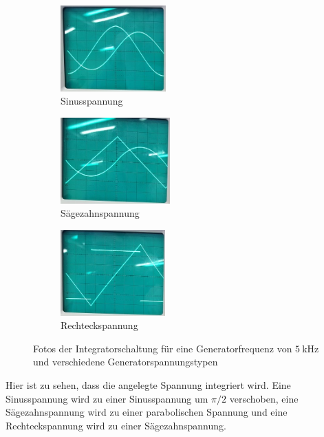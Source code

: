 \begin{figure}
    \centering
    \begin{subfigure}{0.3\textwidth}
        \centering
        \includegraphics[height=3.3cm]{images/foto_03_ausschnitt.jpg}
        \caption{Sinusspannung}
        \label{fig:foto_sin_integrator}
    \end{subfigure}
    \begin{subfigure}{0.3\textwidth}
        \centering
        \includegraphics[height=3.3cm]{images/foto_04_ausschnitt.jpg}
        \caption{Sägezahnspannung}
        \label{fig:foto_saege_integrator}
    \end{subfigure}
    \begin{subfigure}{0.3\textwidth}
        \centering
        \includegraphics[height=3.3cm]{images/foto_05_ausschnitt.jpg}
        \caption{Rechteckspannung}
        \label{fig:foto_rechteck_integrator}
    \end{subfigure}
    \caption{Fotos der Integratorschaltung für eine Generatorfrequenz von $\SI{5}{\kilo\hertz}$ und verschiedene Generatorspannungstypen}
    \label{fig:fotos_integrator}
\end{figure}

Hier ist zu sehen, dass die angelegte Spannung integriert wird. Eine Sinusspannung wird zu einer Sinusspannung um $\pi/2$ verschoben, eine Sägezahnspannung wird zu einer parabolischen Spannung und eine Rechteckspannung wird zu einer Sägezahnspannung.